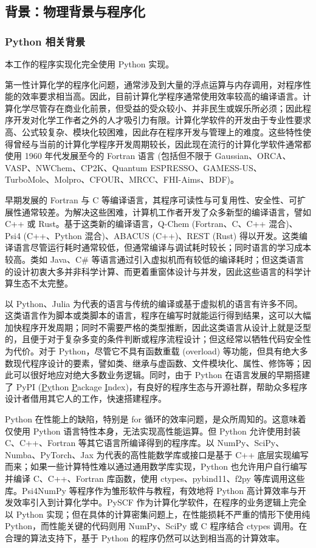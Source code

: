 \subsection{背景：物理背景与程序化}
\label{sec.3.background}

\subsubsection{Python 相关背景}

本工作的程序实现化完全使用 Python 实现。

第一性计算化学的程序化问题，通常涉及到大量的浮点运算与内存调用，对程序性能的效率要求相当高。因此，目前计算化学程序通常使用效率较高的编译语言。计算化学尽管存在商业化前景，但受益的受众较小、并非民生或娱乐所必须；因此程序开发对化学工作者之外的人才吸引力有限。计算化学软件的开发由于专业性要求高、公式较复杂、模块化较困难，因此存在程序开发与管理上的难度。这些特性使得曾经与当前的计算化学程序开发周期较长，因此现在流行的计算化学软件通常都使用 1960 年代发展至今的 Fortran 语言 (包括但不限于 Gaussian、ORCA、VASP、NWChem、CP2K、Quantum ESPRESSO、GAMESS-US、TurboMole、Molpro、CFOUR、MRCC、FHI-Aims、BDF)。

早期发展的 Fortran 与 C 等编译语言，其程序可读性与可复用性、安全性、可扩展性通常较差。为解决这些困难，计算机工作者开发了众多新型的编译语言，譬如 C++ 或 Rust。基于这类新的编译语言，Q-Chem (Fortran、C、C++ 混合)、Psi4 (C++、Python 混合)、ABACUS (C++)、REST (Rust) 得以开发。这类编译语言尽管运行耗时通常较低，但通常编译与调试耗时较长；同时语言的学习成本较高。类如 Java、C\# 等语言通过引入虚拟机而有较低的编译耗时；但这类语言的设计初衷大多并非科学计算、而更着重窗体设计与并发，因此这些语言的科学计算生态不太完整。

以 Python、Julia 为代表的语言与传统的编译或基于虚拟机的语言有许多不同。这类语言作为脚本或类脚本的语言，程序在编写时就能运行得到结果，这可以大幅加快程序开发周期；同时不需要严格的类型推断，因此这类语言从设计上就是泛型的，且便于对于复杂多变的条件判断或程序流程设计；但这经常以牺牲代码安全性为代价。对于 Python，尽管它不具有函数重载 (overload) 等功能，但具有绝大多数现代程序设计的要素，譬如类、继承与虚函数、文件模块化、属性、修饰等；因此可以很好地应对绝大多数业务逻辑。同时，由于 Python 在语言发展的早期搭建了 PyPI (\underline{Py}thon \underline{P}ackage \underline{I}ndex)，有良好的程序生态与开源社群，帮助众多程序设计者借用其它人的工作，快速搭建程序。

Python 在性能上的缺陷，特别是 for 循环的效率问题，是众所周知的。这意味着仅使用 Python 语言特性本身，无法实现高性能运算。但 Python 允许使用封装 C、C++、Fortran 等其它语言所编译得到的程序库。以 NumPy、SciPy、Numba、PyTorch、Jax 为代表的高性能数学库或接口是基于 C++ 底层实现编写而来；如果一些计算特性难以通过通用数学库实现，Python 也允许用户自行编写并编译 C、C++、Fortran 库函数，使用 ctypes、pybind11、f2py 等库调用这些库。Psi4NumPy 等程序作为雏形软件与教程，有效地将 Python 高计算效率与开发效率引入到计算化学中。PySCF 作为计算化学软件，在程序的业务逻辑上完全以 Python 实现；但在具体的计算密集问题上，在性能损耗不严重的情形下使用纯 Python，而性能关键的代码则用 NumPy、SciPy 或 C 程序结合 ctypes 调用。在合理的算法支持下，基于 Python 的程序仍然可以达到相当高的计算效率。

